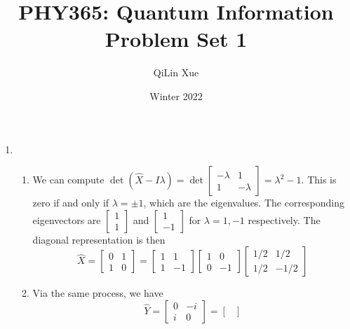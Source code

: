 \documentclass{article}
\title{PHY365: Quantum Information \\ Problem Set 1}
\author{QiLin Xue}
\date{Winter 2022}
\numberwithin{equation}{section}
\begin{document}
\maketitle
\begin{enumerate}
    \item \begin{enumerate}
        \item We can compute $\det(\hat{X}-I\lambda) = \det\begin{bmatrix}
            -\lambda & 1 \\ 
            1 & -\lambda
        \end{bmatrix} = \lambda^2-1.$ This is zero if and only if $\lambda = \pm 1$, which are the eigenvalues. The corresponding eigenvectors are $\begin{bmatrix}
            1 \\ 1
        \end{bmatrix}$ and $\begin{bmatrix}
            1 \\ -1
        \end{bmatrix}$ for $\lambda=1,-1$ respectively. The diagonal representation is then
        \begin{equation}
            \hat{X} = \begin{bmatrix}
                0 & 1\\ 
                1 & 0
            \end{bmatrix}
            =
            \begin{bmatrix}
                1 & 1 \\ 
                1 & -1 
            \end{bmatrix}
            \begin{bmatrix}
                1 & 0 \\ 
                0 & -1
            \end{bmatrix}
            \begin{bmatrix}
                1/2 & 1/2 \\ 
                1/2 & -1/2
            \end{bmatrix}
        \end{equation}
        \item Via the same process, we have
        \begin{equation}
            \hat{Y} = \begin{bmatrix}
                0 & -i \\ 
                i & 0
            \end{bmatrix} = \begin{bmatrix}

\end{bmatrix}
\end{equation}
\end{enumerate}
\end{enumerate}
\end{document}
